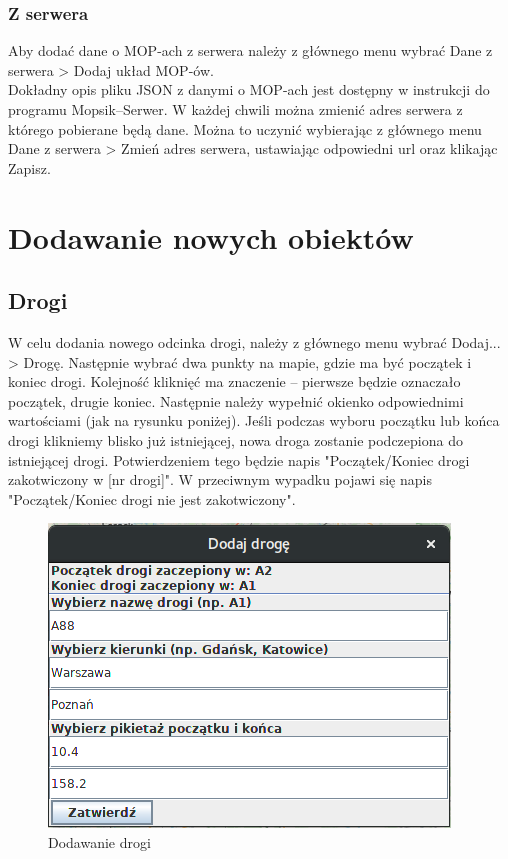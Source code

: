 \documentclass[10pt,paper=a4 BCOR0, DIV15, titlepage=false, oneside]{scrbook} %
\begin{document}
        \subsection{Z serwera} 
        Aby dodać dane o MOP-ach z serwera należy z
        głównego menu wybrać Dane z serwera > Dodaj układ MOP-ów. \\
        Dokładny opis pliku JSON z danymi o MOP-ach jest dostępny w instrukcji do programu Mopsik--Serwer.
        W każdej chwili można zmienić adres serwera z którego pobierane będą dane. Można to uczynić wybierając z głównego menu Dane z serwera > Zmień adres serwera, ustawiając odpowiedni url oraz klikając Zapisz.

        \chapter*{Dodawanie nowych obiektów}
        \setcounter{section}{0}
        \addtocounter{chapter}{1}
        \section{Drogi}
        W celu dodania nowego odcinka drogi, należy z głównego menu wybrać
        Dodaj... > Drogę. Następnie wybrać dwa punkty na mapie, gdzie ma być
        początek i koniec drogi. Kolejność kliknięć ma znaczenie -- pierwsze
        będzie oznaczało początek, drugie koniec. Następnie należy wypełnić
        okienko odpowiednimi wartościami (jak na rysunku poniżej). Jeśli podczas wyboru początku lub końca drogi klikniemy blisko już istniejącej, nowa droga zostanie podczepiona do istniejącej drogi. Potwierdzeniem tego będzie napis "Początek/Koniec drogi zakotwiczony w [nr drogi]". W przeciwnym wypadku pojawi się napis "Początek/Koniec drogi nie jest zakotwiczony".

       \begin{figure}[ht]
        \centering
       \includegraphics[width=.3\textwidth]{dodawanie_drogi.png}
        \caption{Dodawanie drogi}
      \end{figure}
\end{document}
